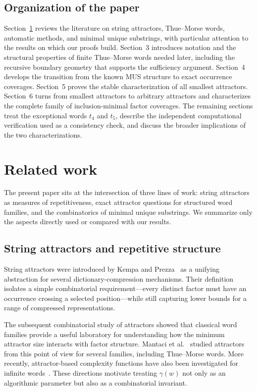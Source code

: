 \documentclass[11pt,a4paper]{article}
\theoremstyle{definition}\newtheorem{definition}[theorem]{Definition}
\theoremstyle{remark}\newtheorem{remark}[theorem]{Remark}
\begin{document}
\subsection{Organization of the paper}
Section~\ref{sec:related-work} reviews the literature on string attractors, Thue--Morse words, automatic methods, and minimal unique substrings, with particular attention to the results on which our proofs build. Section~3 introduces notation and the structural properties of finite Thue--Morse words needed later, including the recursive boundary geometry that supports the sufficiency argument. Section~4 develops the transition from the known MUS structure to exact occurrence coverages. Section~5 proves the stable characterization of all smallest attractors. Section~6 turns from smallest attractors to arbitrary attractors and characterizes the complete family of inclusion-minimal factor coverages. The remaining sections treat the exceptional words $t_4$ and $t_5$, describe the independent computational verification used as a consistency check, and discuss the broader implications of the two characterizations.



\section{Related work}
\label{sec:related-work}

The present paper sits at the intersection of three lines of work: string attractors as measures of repetitiveness, exact attractor questions for structured word families, and the combinatorics of minimal unique substrings. We summarize only the aspects directly used or compared with our results.

\subsection{String attractors and repetitive structure}
String attractors were introduced by Kempa and Prezza~\cite{KempaPrezza2018} as a unifying abstraction for several dictionary-compression mechanisms. Their definition isolates a simple combinatorial requirement---every distinct factor must have an occurrence crossing a selected position---while still capturing lower bounds for a range of compressed representations.

The subsequent combinatorial study of attractors showed that classical word families provide a useful laboratory for understanding how the minimum attractor size interacts with factor structure. Mantaci et al.~\cite{Mantaci2019,Mantaci2021} studied attractors from this point of view for several families, including Thue--Morse words. More recently, attractor-based complexity functions have also been investigated for infinite words~\cite{Cassaigne2024}. These directions motivate treating $\gamma(w)$ not only as an algorithmic parameter but also as a combinatorial invariant.
\end{document}
